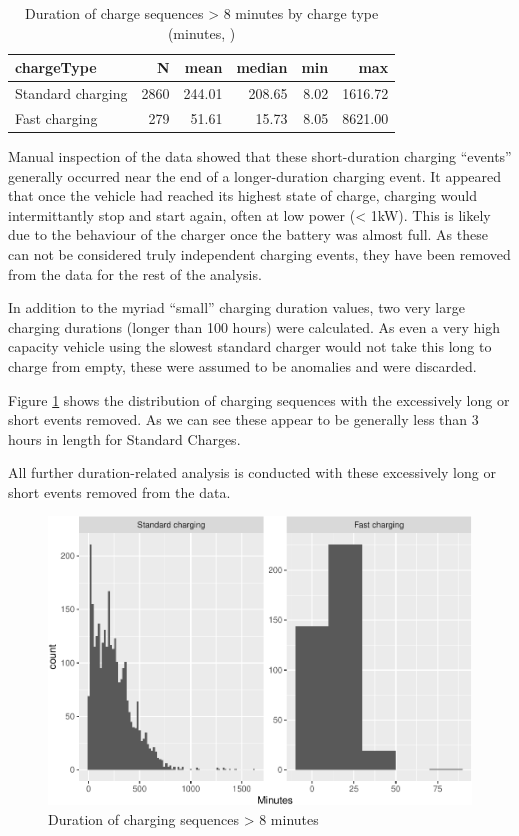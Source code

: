 \documentclass[]{article}
\begin{document}
\begin{table}[t]

\caption{\label{tab:durationDescTableReduced}Duration of charge sequences > 8 minutes by charge type (minutes, )}
\centering
\begin{tabular}{l|r|r|r|r|r}
\hline
chargeType & N & mean & median & min & max\\
\hline
Standard charging & 2860 & 244.01 & 208.65 & 8.02 & 1616.72\\
\hline
Fast charging & 279 & 51.61 & 15.73 & 8.05 & 8621.00\\
\hline
\end{tabular}
\end{table}

Manual inspection of the data showed that these short-duration charging
``events'' generally occurred near the end of a longer-duration charging
event. It appeared that once the vehicle had reached its highest state
of charge, charging would intermittantly stop and start again, often at
low power (\textless{} 1kW). This is likely due to the behaviour of the
charger once the battery was almost full. As these can not be considered
truly independent charging events, they have been removed from the data
for the rest of the analysis.

In addition to the myriad ``small'' charging duration values, two very
large charging durations (longer than 100 hours) were calculated. As
even a very high capacity vehicle using the slowest standard charger
would not take this long to charge from empty, these were assumed to be
anomalies and were discarded.

Figure \ref{fig:longDuration} shows the distribution of charging
sequences with the excessively long or short events removed. As we can
see these appear to be generally less than 3 hours in length for
Standard Charges.

All further duration-related analysis is conducted with these
excessively long or short events removed from the data.

\begin{figure}
\centering
\includegraphics{EVBB_report_files/figure-latex/longDuration-1.pdf}
\caption{\label{fig:longDuration}Duration of charging sequences
\textgreater{} 8 minutes}
\end{figure}
\end{document}
